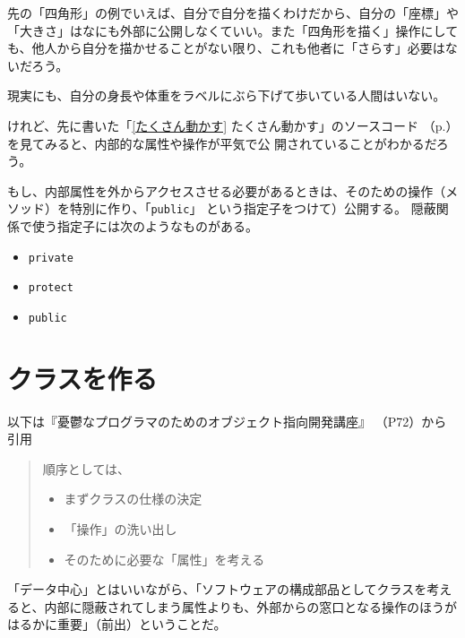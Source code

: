 \documentclass[uplatex,a4j,11pt]{jsarticle}
\renewcommand{\baselinestretch}{1.08}
\begin{document}
先の「四角形」の例でいえば、自分で自分を描くわけだから、自分の「座標」や
「大きさ」はなにも外部に公開しなくていい。また「四角形を描く」操作にして
も、他人から自分を描かせることがない限り、これも他者に「さらす」必要はな
いだろう。

現実にも、自分の身長や体重をラベルにぶら下げて歩いている人間はいない。

けれど、先に書いた「\ref{たくさん動かす} たくさん動かす」のソースコード
（p.\pageref{174855_21Jul14}）を見てみると、内部的な属性や操作が平気で公
開されていることがわかるだろう。

もし、内部属性を外からアクセスさせる必要があるときは、そのための操作（メ
ソッド）を特別に作り、「\verb|public|」 という指定子をつけて）公開する。
隠蔽関係で使う指定子には次のようなものがある。

\begin{itemize}
 \item \verb|private|
 \item \verb|protect|
 \item \verb|public|
\end{itemize}

\section{クラスを作る}
以下は『憂鬱なプログラマのためのオブジェクト指向開発講座』
\cite{Tucker}（P72）から引用

    \begin{quote}
     \begin{minipage}{\linewidth}
      \begin{shadebox}
       \def\baselinestretch{.8}\selectfont
       \small
       
       順序としては、
       
       \begin{itemize}
        \item まずクラスの仕様の決定
        \item 「操作」の洗い出し
        \item そのために必要な「属性」を考える
       \end{itemize}
       
      \end{shadebox} 
	 \end{minipage}
	\end{quote}

「データ中心」とはいいながら、「ソフトウェアの構成部品としてクラスを考え
ると、内部に隠蔽されてしまう属性よりも、外部からの窓口となる操作のほうが
はるかに重要」（前出）ということだ。
\end{document}
